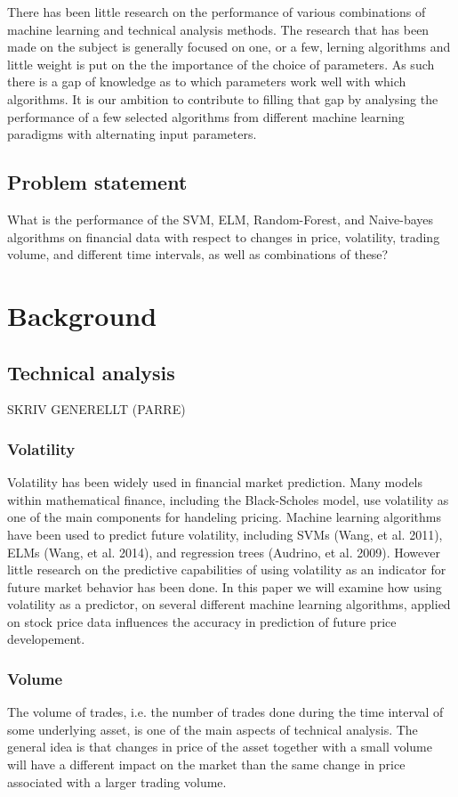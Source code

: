 \documentclass{article}
\begin{document}
There has been little research on the performance of various combinations of machine learning and technical analysis methods. The research that has been made on the subject is generally focused on one, or a few, lerning algorithms and little weight is put on the the importance of the choice of parameters. As such there is a gap of knowledge as to which parameters work well with which algorithms. It is our ambition to contribute to filling that gap by analysing the performance of a few selected algorithms from different machine learning paradigms with alternating input parameters.

\subsection{Problem statement}
What is the performance of the SVM, ELM, Random-Forest, and Naive-bayes algorithms on financial data with respect to changes in price, volatility, trading volume, and different time intervals, as well as combinations of these?


\section{Background}
\subsection{Technical analysis}
SKRIV GENERELLT (PARRE)
\subsubsection{Volatility}
Volatility has been widely used in financial market prediction. Many models within mathematical finance, including the Black-Scholes model, use volatility as one of the main components for handeling pricing. Machine learning algorithms have been used to predict future volatility, including SVMs (Wang, et al. 2011), ELMs (Wang, et al. 2014), and regression trees (Audrino, et al. 2009).  However little research on the predictive capabilities of using volatility as an indicator for future market behavior has been done. In this paper we will examine how using volatility as a predictor, on several different machine learning algorithms, applied on stock price data influences the accuracy in prediction of future price developement. 

\subsubsection{Volume}
The volume of trades, i.e. the number of trades done during the time interval of some underlying asset, is one of the main aspects of technical analysis. The general idea is that changes in price of the asset together with a small volume will have a different impact on the market than the same change in price associated with a larger trading volume. 
\end{document}
